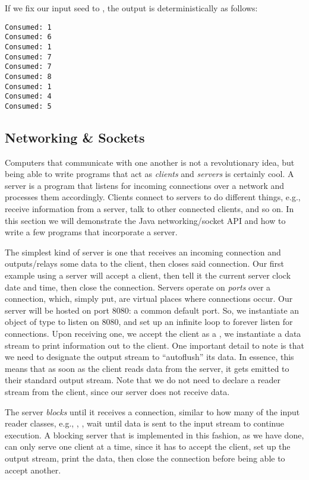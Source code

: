If we fix our input seed to , the output is deterministically as follows:

\begin{verbatim}
Consumed: 1
Consumed: 6
Consumed: 1
Consumed: 7
Consumed: 7
Consumed: 8
Consumed: 1
Consumed: 4
Consumed: 5
\end{verbatim}

\subsection*{Networking \& Sockets}

Computers that communicate with one another is not a revolutionary idea, but being able to write programs that act as \textit{clients} and \textit{servers} is certainly cool. A server is a program that listens for incoming connections over a network and processes them accordingly. Clients connect to servers to do different things, e.g., receive information from a server, talk to other connected clients, and so on. In this section we will demonstrate the Java networking/socket API and how to write a few programs that incorporate a server.

\example The simplest kind of server is one that receives an incoming connection and outputs/relays some data to the client, then closes said connection. Our first example using a server will accept a client, then tell it the current server clock date and time, then close the connection. Servers operate on \textit{ports} over a connection, which, simply put, are virtual places where connections occur. Our server will be hosted on port $8080$: a common default port. So, we instantiate an object of type  to listen on $8080$, and set up an infinite loop to forever listen for connections. Upon receiving one, we accept the client as a , we instantiate a data stream to print information out to the client. One important detail to note is that we need to designate the  output stream to ``autoflush'' its data. In essence, this means that as soon as the client reads data from the server, it gets emitted to their standard output stream. Note that we do not need to declare a reader stream from the client, since our server does not receive data.

The server \textit{blocks} until it receives a connection, similar to how many of the input reader classes, e.g., , , wait until data is sent to the input stream to continue execution. A blocking server that is implemented in this fashion, as we have done, can only serve one client at a time, since it has to accept the client, set up the output stream, print the data, then close the connection before being able to accept another.

